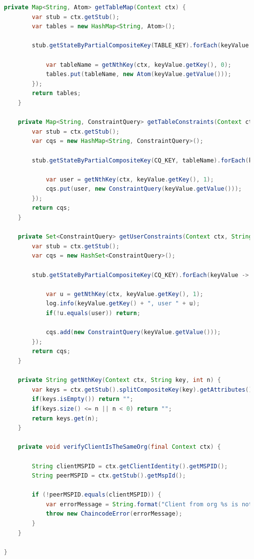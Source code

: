 \documentclass[12pt]{article}
\begin{document}
\begin{lstlisting}[style=java, language=java]
    private Map<String, Atom> getTableMap(Context ctx) {
        var stub = ctx.getStub();
        var tables = new HashMap<String, Atom>();

        stub.getStateByPartialCompositeKey(TABLE_KEY).forEach(keyValue -> {

            var tableName = getNthKey(ctx, keyValue.getKey(), 0);
            tables.put(tableName, new Atom(keyValue.getValue()));
        });
        return tables;
    }

    private Map<String, ConstraintQuery> getTableConstraints(Context ctx, String tableName) {
        var stub = ctx.getStub();
        var cqs = new HashMap<String, ConstraintQuery>();

        stub.getStateByPartialCompositeKey(CQ_KEY, tableName).forEach(keyValue -> {

            var user = getNthKey(ctx, keyValue.getKey(), 1);
            cqs.put(user, new ConstraintQuery(keyValue.getValue()));
        });
        return cqs;
    }

    private Set<ConstraintQuery> getUserConstraints(Context ctx, String user) {
        var stub = ctx.getStub();
        var cqs = new HashSet<ConstraintQuery>();

        stub.getStateByPartialCompositeKey(CQ_KEY).forEach(keyValue -> {

            var u = getNthKey(ctx, keyValue.getKey(), 1);
            log.info(keyValue.getKey() + ", user " + u);
            if(!u.equals(user)) return;

            cqs.add(new ConstraintQuery(keyValue.getValue()));
        });
        return cqs;
    }

    private String getNthKey(Context ctx, String key, int n) {
        var keys = ctx.getStub().splitCompositeKey(key).getAttributes();
        if(keys.isEmpty()) return "";
        if(keys.size() <= n || n < 0) return "";
        return keys.get(n);
    }

    private void verifyClientIsTheSameOrg(final Context ctx) {

        String clientMSPID = ctx.getClientIdentity().getMSPID();
        String peerMSPID = ctx.getStub().getMspId();

        if (!peerMSPID.equals(clientMSPID)) {
            var errorMessage = String.format("Client from org %s is not authorized to read or write private data from an org %s peer", clientMSPID, peerMSPID);
            throw new ChaincodeError(errorMessage);
        }
    }

}
    \end{lstlisting}
\end{document}
